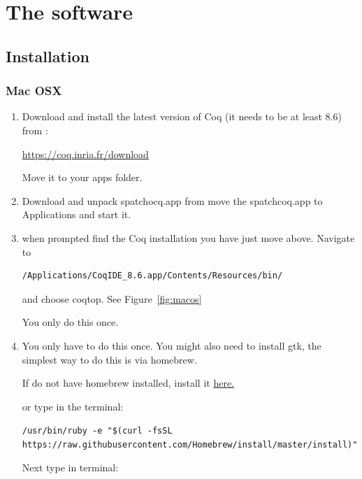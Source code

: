 \chapter{The software}\label{ch:thesoftware}
\section{ Installation}
\subsection{Mac OSX}
\begin{enumerate}
\item Download and install  the latest version of Coq (it needs to be at least 8.6) from :

\href{https://coq.inria.fr/download}{https://coq.inria.fr/download}

Move it to your apps folder.


\item  Download and unpack spatchocq.app from 
move the spatchcoq.app to Applications and start it. 

\item when prompted find the Coq installation you have just move above. Navigate to 
\begin{verbatim}
/Applications/CoqIDE_8.6.app/Contents/Resources/bin/
\end{verbatim}
and choose coqtop. See Figure~\ref{fig:macos}

You only do this once.
\item  You only have to do this once. You might also need to install gtk, the simplest way to do this is  via homebrew.

If do not have homebrew installed,  install it
\href{https://brew.sh}{ here.}

or  type in the terminal:

{\small \texttt{/usr/bin/ruby -e "\$(curl -fsSL https://raw.githubusercontent.com/Homebrew/install/master/install)"}

Next type in terminal:

}
\end{enumerate}
